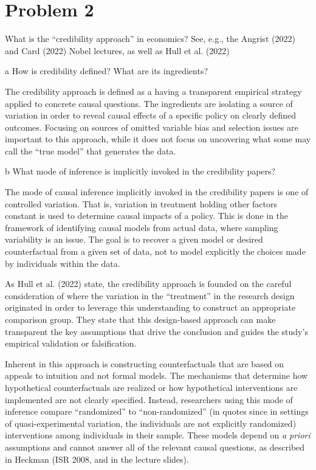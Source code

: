 \documentclass{article}
\begin{document}
\newpage
\section*{Problem 2}
What is the “credibility approach” in economics? See, e.g., the Angrist
(2022) and Card (2022) Nobel lectures, as well as Hull et al. (2022)
\begin{problem}{a}
How is credibility defined? What are its ingredients?
\end{problem}

The credibility approach is defined as a having a transparent empirical strategy applied to concrete causal questions. The ingredients are isolating a source of variation in order to reveal causal effects of a specific policy on clearly defined outcomes. Focusing on sources of omitted variable bias and selection issues are important to this approach, while it does not focus on uncovering what some may call the ``true model'' that generates the data. 

\begin{problem}{b}
What mode of inference is implicitly invoked in the credibility papers?
\end{problem}

The mode of causal inference implicitly invoked in the credibility papers is one of controlled variation. That is, variation in treatment holding other factors constant is used to determine causal impacts of a policy. This is done in the framework of identifying causal models from actual data, where sampling variability is an issue. The goal is to recover a given model or desired counterfactual from a given set of data, not to model explicitly the choices made by individuals within the data. 

As Hull et al. (2022) state, the credibility approach is founded on the careful consideration of where the variation in the ``treatment'' in the research design originated in order to leverage this understanding to construct an appropriate comparison group. They state that this design-based approach can make transparent the key assumptions that drive the conclusion and guides the study's empirical validation or falsification.


Inherent in this approach is constructing counterfactuals that are based on appeals to intuition and not formal models. The mechanisms that determine how hypothetical counterfactuals are realized or how hypothetical interventions are implemented are not clearly specified. Instead, researchers using this mode of inference compare ``randomized'' to ``non-randomized'' (in quotes since in settings of quasi-experimental variation, the individuals are not explicitly randomized) interventions among individuals in their sample. These models depend on \textit{a priori} assumptions and cannot answer all of the relevant causal questions, as described in Heckman (ISR 2008, and in the lecture slides).
\end{document}
